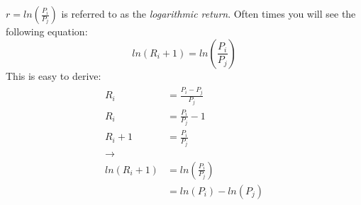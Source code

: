 \documentclass[11pt, oneside]{article}   	%
\begin{document}
$r = ln(\frac{P_i}{P_j})$ is referred to as the \emph{logarithmic return}. Often times you will see the following equation:
\begin{equation}
	ln(R_i + 1) = ln(\frac{P_i}{P_j})
\end{equation}
This is easy to derive:
\begin{align}
	\begin{split}
		R_i & = \frac{P_i - P_j}{P_j} \\
		R_i & = \frac{P_i}{P_j} - 1\\
		R_i + 1 &  = \frac{P_i}{P_j}\\
		\rightarrow\\
		ln(R_i + 1) & = ln(\frac{P_i}{P_j}) \\ 
		&  = ln(P_i) - ln(P_j)\\
	\end{split}
\end{align}
\end{document}
